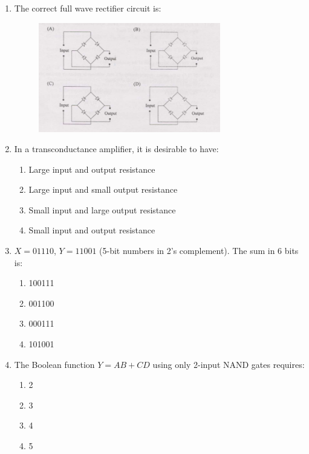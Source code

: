 \documentclass[journal,12pt,onecolumn]{IEEEtran}
\theoremstyle{remark}
\begin{document}
\begin{enumerate}
\item The correct full wave rectifier circuit is:
\begin{figure}[ht!]
    \centering
    \includegraphics[width=0.75\textwidth]{Q11.png}
    \caption{}
    \label{fig:Q11.png}
\end{figure}

\hfill{}
\item In a transconductance amplifier, it is desirable to have: 
\hfill{}
\begin{enumerate}
    \item Large input and output resistance
    \item Large input and small output resistance
    \item Small input and large output resistance
    \item Small input and output resistance
\end{enumerate}

\item $ X = 01110 $, $ Y = 11001 $ (5-bit numbers in 2's complement). The sum in 6 bits is: 
\hfill{}
\begin{multicols}{4}

\begin{enumerate}
    \item 100111
    \item 001100
    \item 000111
    \item 101001
\end{enumerate}
\end{multicols}

\item The Boolean function $ Y = AB + CD $ using only 2-input NAND gates requires: 
\hfill{}
\begin{multicols}{4}
\begin{enumerate}
    \item 2
    \item 3
    \item 4
    \item 5
\end{enumerate}
\end{multicols}



\end{enumerate}
\end{document}
